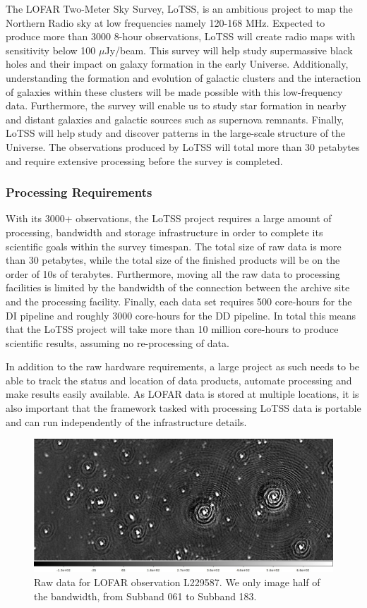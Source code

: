 The LOFAR Two-Meter Sky Survey, LoTSS, is an ambitious project to map the Northern Radio sky at low frequencies namely 120-168 MHz. Expected to produce more than 3000 8-hour observations, LoTSS will create radio maps with sensitivity below 100 $\mu$Jy/beam. This survey will help study supermassive black holes and their impact on galaxy formation in the early Universe. Additionally, understanding the formation and evolution of galactic clusters and the interaction of galaxies within these clusters will be made possible with this low-frequency data. Furthermore, the survey will enable us to study star formation in nearby and distant galaxies and galactic sources such as supernova remnants. Finally, LoTSS will help study and discover patterns in the large-scale structure of the Universe.  The observations produced by LoTSS will total more than 30 petabytes and require extensive processing before the survey is completed. 

\subsubsection{Processing Requirements}   

With its 3000+ observations, the LoTSS project requires a large amount of processing, bandwidth and storage infrastructure in order to complete its scientific goals within the survey timespan. The total size of raw data is more than 30 petabytes, while the total size of the finished products will be on the order of 10s of terabytes. Furthermore, moving all the raw data to processing facilities is limited by the bandwidth of the connection between the archive site and the processing facility. Finally, each data set requires 500 core-hours for the DI pipeline and roughly 3000 core-hours for the DD pipeline. In total this means that the LoTSS project will take more than 10 million core-hours to produce scientific results, assuming no re-processing of data. 
 
In addition to the raw hardware requirements, a large project as such needs to be able to track the status and location of data products, automate processing and make results easily available. As LOFAR data is stored at multiple locations, it is also important that the framework tasked with processing LoTSS data is portable and can run independently of the infrastructure details.

\begin{figure}[h]
    \centering
    \includegraphics[width=.8\linewidth]{background/figures/raw_image1.jpeg}
    \caption[Image of the raw data]{Raw data for LOFAR observation L229587. We only image half of the bandwidth, from Subband 061 to Subband 183.  }
    \label{fig:L229587_raw}
\end{figure}



